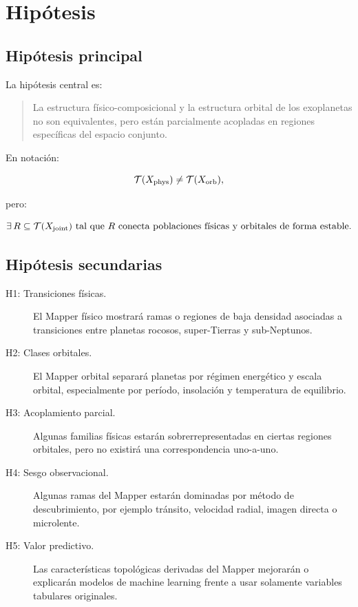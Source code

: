 \documentclass[11pt,letterpaper]{article}
\newcommand{\phys}{\rm phys}
\newcommand{\orb}{\rm orb}
\newcommand{\joint}{\rm joint}
\begin{document}
\section{Hipótesis}

\subsection{Hipótesis principal}

La hipótesis central es:

\begin{quote}
La estructura físico-composicional y la estructura orbital de los exoplanetas no son equivalentes, pero están parcialmente acopladas en regiones específicas del espacio conjunto.
\end{quote}

En notación:

\begin{equation}
\mathcal{T}(X_{\phys}) \neq \mathcal{T}(X_{\orb}),
\end{equation}

pero:

\begin{equation}
\exists\, R\subseteq \mathcal{T}(X_{\joint}) \text{ tal que } R \text{ conecta poblaciones físicas y orbitales de forma estable.}
\end{equation}

\subsection{Hipótesis secundarias}

\begin{description}
    \item[H1: Transiciones físicas.] El Mapper físico mostrará ramas o regiones de baja densidad asociadas a transiciones entre planetas rocosos, super-Tierras y sub-Neptunos.
    \item[H2: Clases orbitales.] El Mapper orbital separará planetas por régimen energético y escala orbital, especialmente por período, insolación y temperatura de equilibrio.
    \item[H3: Acoplamiento parcial.] Algunas familias físicas estarán sobrerrepresentadas en ciertas regiones orbitales, pero no existirá una correspondencia uno-a-uno.
    \item[H4: Sesgo observacional.] Algunas ramas del Mapper estarán dominadas por método de descubrimiento, por ejemplo tránsito, velocidad radial, imagen directa o microlente.
    \item[H5: Valor predictivo.] Las características topológicas derivadas del Mapper mejorarán o explicarán modelos de machine learning frente a usar solamente variables tabulares originales.
\end{description}
\end{document}
